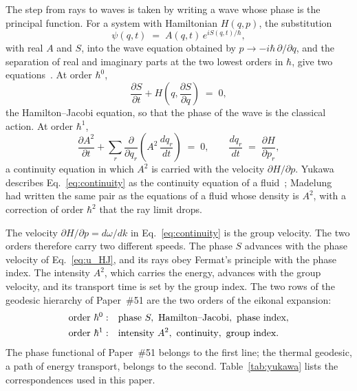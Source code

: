 \documentclass[%
 reprint, amsmath,amssymb, aps, prb, ]{revtex4-2}
\numberwithin{equation}{section}
\begin{document}
The step from rays to waves is taken by writing a wave whose phase is the principal function. For a system with Hamiltonian $H(q,p)$, the substitution
\begin{equation}
\psi(q,t) \;=\; A(q,t)\,e^{iS(q,t)/\hbar},
\label{eq:eikonal}
\end{equation}
with real $A$ and $S$, into the wave equation obtained by $p \to -i\hbar\,\partial/\partial q$, and the separation of real and imaginary parts at the two lowest orders in $\hbar$, give two equations~\cite{Yukawa1954}. At order $\hbar^0$,
\begin{equation}
\frac{\partial S}{\partial t} + H\!\left(q, \frac{\partial S}{\partial q}\right) \;=\; 0,
\label{eq:HJ}
\end{equation}
the Hamilton--Jacobi equation, so that the phase of the wave is the classical action. At order $\hbar^1$,
\begin{equation}
\frac{\partial A^2}{\partial t} + \sum_r \frac{\partial}{\partial q_r}\!\left(A^2\,\frac{dq_r}{dt}\right) \;=\; 0,
\qquad
\frac{dq_r}{dt} \;=\; \frac{\partial H}{\partial p_r},
\label{eq:continuity}
\end{equation}
a continuity equation in which $A^2$ is carried with the velocity $\partial H/\partial p$. Yukawa describes Eq.~\eqref{eq:continuity} as the continuity equation of a fluid~\cite{Yukawa1954}; Madelung~\cite{Madelung1927} had written the same pair as the equations of a fluid whose density is $A^2$, with a correction of order $\hbar^2$ that the ray limit drops.

The velocity $\partial H/\partial p = d\omega/dk$ in Eq.~\eqref{eq:continuity} is the group velocity. The two orders therefore carry two different speeds. The phase $S$ advances with the phase velocity of Eq.~\eqref{eq:u_HJ}, and its rays obey Fermat's principle with the phase index. The intensity $A^2$, which carries the energy, advances with the group velocity, and its transport time is set by the group index. The two rows of the geodesic hierarchy of Paper~\#51 are the two orders of the eikonal expansion:
\begin{align}
\text{order } \hbar^0:&\quad \text{phase } S,\ \text{Hamilton--Jacobi},\ \text{phase index},
\notag\\
\text{order } \hbar^1:&\quad \text{intensity } A^2,\ \text{continuity},\ \text{group index}.
\label{eq:twoorders}
\end{align}
The phase functional of Paper~\#51 belongs to the first line; the thermal geodesic, a path of energy transport, belongs to the second. Table~\ref{tab:yukawa} lists the correspondences used in this paper.
\end{document}
